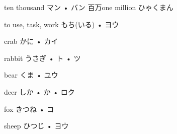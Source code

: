 



\setcounter{cardnum}{153}

		{ten thousand}
		{マン • バン}
		{百万}{one million ひゃくまん}
		{}{}
		{}{}
		{}{}
		{}{}

		{to use, task, work}
		{もち(いる) • ヨウ}
		{}{}
		{}{}
		{}{}
		{}{}
		{}{}

\setcounter{cardnum}{1}

		{crab}
		{かに • カイ}
		{}{}
		{}{}
		{}{}
		{}{}
		{}{}

		{rabbit}
		{うさぎ • ト • ツ}
		{}{}
		{}{}
		{}{}
		{}{}
		{}{}

		{bear}
		{くま • ユウ}
		{}{}
		{}{}
		{}{}
		{}{}
		{}{}

		{deer}
		{しか • か • ロク}
		{}{}
		{}{}
		{}{}
		{}{}
		{}{}

		{fox}
		{きつね • コ}
		{}{}
		{}{}
		{}{}
		{}{}
		{}{}

		{sheep}
		{ひつじ • ヨウ}
		{}{}
		{}{}
		{}{}
		{}{}
		{}{}

